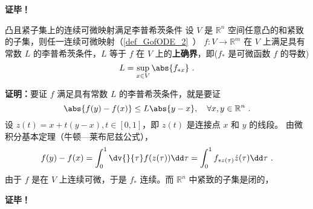 \textbf{证毕！}

\begin{theorem}{凸且紧子集上的连续可微映射满足李普希茨条件}
设 $V$ 是 $\mathbb R^n$ 空间任意凸的和紧致的子集，则任一连续可微映射（\autoref{def_GofODE_2}~） $f:V\rightarrow \mathbb R^m$ 在 $V$ 上满足具有常数 $L$ 的李普希茨条件，$L$ 等于 $f$ 在 $V$ 上的\textbf{上确界}，即($f_*$ 是可微函数 $f$ 的导数)
\begin{equation}
L=\sup_{x\in V}\abs{f_{*x}}~.
\end{equation}
\end{theorem}
\textbf{证明：}要证 $f$ 满足具有常数 $L$ 的李普希茨条件，就是要证
\begin{equation}
\abs{f(y)-f(x)}\leq L\abs{y-x},\quad\forall x,y\in\mathbb R^n~.
\end{equation}
设 $z(t)=x+t(y-x),t\in[0,1]$，即 $z(t)$ 是连接点 $x$ 和 $y$ 的线段。
由微积分基本定理（牛顿—莱布尼兹公式），
\begin{equation}
f(y)-f(x)=\int_0^1\dv{}{\tau}f(z(\tau))\dd\tau=\int_0^1f_{*z(\tau)}\dot z(\tau)\dd\tau~.
\end{equation}
由于 $f$ 是在 $V$ 上连续可微，于是 $f_*$ 连续。而 $\mathbb R^n$ 中紧致的子集是闭的， 


\textbf{证毕！}